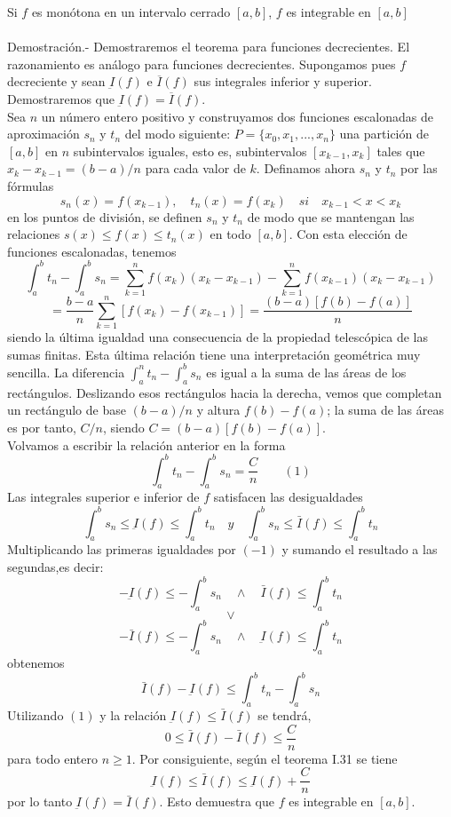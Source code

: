 \begin{multicols}{2}
\begin{teo} Si $f$ es monótona en un intervalo cerrado $[a,b]$, $f$ es integrable en $[a,b]$\\\\
    Demostración.-\; Demostraremos el teorema para funciones decrecientes. El razonamiento es análogo para funciones decrecientes. Supongamos pues $f$ decreciente y sean $\underbar{I}(f)$ e $\overline{I}(f)$ sus integrales inferior y superior. Demostraremos que $\underbar{I}(f)=\overline{I}(f)$. \\
    Sea $n$ un número entero positivo y construyamos dos funciones escalonadas de aproximación $s_n$ y $t_n$ del modo siguiente: $P=\lbrace x_0,x_1,...,x_n \rbrace$ una partición de $[a,b]$ en $n$ subintervalos iguales, esto es, subintervalos $[x_{k-1},x_k]$ tales que $x_k-x_{k-1} = (b-a)/n$ para cada valor de $k$. Definamos ahora $s_n$ y $t_n$ por las fórmulas $$s_n(x)=f(x_{k-1}), \quad t_n(x)=f(x_k) \quad si \quad x_{k-1}<x<x_k$$ en los puntos de división, se definen $s_n$ y $t_n$ de modo que se mantengan las relaciones $s(x)\leq f(x) \leq t_n(x)$ en todo $[a,b]$. Con esta elección de funciones escalonadas, tenemos 
    $$\int_a^b t_n - \int_a^b s_n = \sum\limits_{k=1}^n f(x_k)(x_k-x_{k-1}) - \sum\limits_{k=1}^n f(x_{k-1})(x_k-x_{k-1})  $$ $$ = \dfrac{b-a}{n}\sum\limits_{k=1}^n \left[f(x_{k}) - f(x_{k-1})\right]=\dfrac{(b-a)\left[f(b)-f(a)\right]}{n}$$
    siendo la última igualdad una consecuencia de la propiedad telescópica de las sumas finitas. Esta última relación tiene una interpretación geométrica muy sencilla. La diferencia $\int_a^n t_n - \int_a^b s_n$ es igual a la suma de las áreas de los rectángulos. Deslizando esos rectángulos hacia la derecha, vemos que completan un rectángulo de base $(b-a)/n$ y altura $f(b)-f(a)$; la suma de las áreas es por tanto, $C/n$, siendo $C=(b-a)\left[f(b)-f(a)\right]$.\\
    Volvamos a escribir la relación anterior en la forma $$\int_a^b t_n - \int_a^b s_n = \dfrac{C}{n} \qquad (1)$$
    Las integrales superior e inferior de $f$ satisfacen las desigualdades $$\int_a^b s_n \leq \underbar{I}(f) \leq \int_a^b t_n \quad y \quad \int_a^b s_n \leq \bar{I}(f)\leq \int_a^b t_n$$
    Multiplicando las primeras igualdades por $(-1)$ y sumando el resultado a las segundas,es decir: $$-\underbar{I}(f)\leq - \int_a^b s_n\quad \land\quad \bar{I}(f) \leq \int_a^b t_n$$ $$\lor$$ $$-\bar{I}(f)\leq -\int_a^b s_n \quad \land\quad \underbar{I}(f)\leq \int_a^b t_n$$ obtenemos $$\bar{I}(f)-\underbar{I}(f) \leq \int_a^b t_n - \int_a^b s_n$$ 
    Utilizando $(1)$ y la relación $\underbar{I}(f) \leq \bar{I}(f)$ se tendrá, $$0\leq \bar{I}(f) - \bar{I}(f) \leq \dfrac{C}{n}$$
    para todo entero $n\geq 1$. Por consiguiente, según el teorema I.31 se tiene $$\underbar{I}(f)\leq \bar{I}(f)\leq \underbar{I}(f) + \dfrac{C}{n}$$
    por lo tanto $\underbar{I}(f)=\bar{I}(f)$. Esto demuestra que $f$ es integrable en $[a,b]$.
\end{teo}



\end{multicols}

